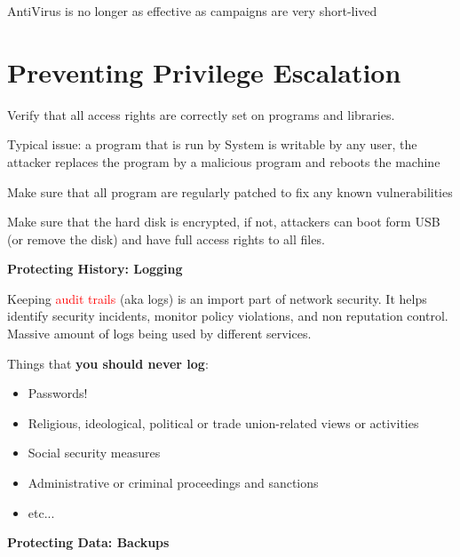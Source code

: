 \documentclass[11pt]{article}
\begin{document}
\begin{tcolorbox}[
  colback=orange!15,     %
  colframe=black!50,    %
  boxrule=1pt,       %
  arc=3mm,             %
  left=4mm, right=4mm, top=2mm, bottom=2mm %
  ]
AntiVirus is no longer as effective as campaigns are very short-lived
\end{tcolorbox}

\section*{Preventing Privilege Escalation}

Verify that all access rights are correctly set on programs and libraries. 

Typical issue: a program that is run by System is writable by any user, the attacker replaces the program by a malicious program and reboots the machine

Make sure that all program are regularly patched to fix any known vulnerabilities

Make sure that the hard disk is encrypted, if not, attackers can boot form USB (or remove the disk) and have full access rights to all files. 

\vspace{0.5cm}

\begin{center}
  {\LARGE \textbf{Protecting History: Logging}}
\end{center}
\vspace{0.5cm}
Keeping \textcolor{red}{audit trails} (aka logs) is an import part of network security. It helps identify security incidents, monitor policy violations, and non reputation control. Massive amount of logs being used by different services. 

Things that \textbf{you should never log}: 
\begin{itemize}
	\item Passwords!
	\item Religious, ideological, political or trade union-related views or activities
	\item Social security measures
	\item Administrative or criminal proceedings and sanctions
	\item etc...
\end{itemize}

\vspace{0.5cm}

\begin{center}
  {\LARGE \textbf{Protecting Data: Backups}}
\end{center}
\vspace{0.5cm}
\end{document}
